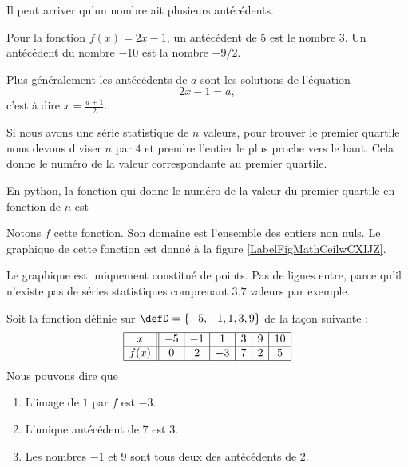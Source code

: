 Il peut arriver qu'un nombre ait plusieurs antécédents.

\begin{example}
    Pour la fonction \( f(x)=2x-1\), un antécédent de \( 5\) est le nombre \( 3\). Un antécédent du nombre \( -10\) est la nombre \( -9/2\).

    Plus généralement les antécédents de \( a\) sont les solutions de l'équation
    \begin{equation}
        2x-1=a,
    \end{equation}
    c'est à dire \( x=\frac{ a+1 }{2}\).
\end{example}

\begin{example} \label{EqlaIGDz}
    Si nous avons une série statistique de \( n\) valeurs, pour trouver le premier quartile nous devons diviser \( n\) par \( 4\) et prendre l'entier le plus proche vers le haut. Cela donne le numéro de la valeur correspondante au premier quartile.

    En python, la fonction qui donne le numéro de la valeur du premier quartile en fonction de \( n\) est
    \begin{quote}
    \end{quote}
    Notons \( f\) cette fonction. Son domaine est l'ensemble des entiers non nuls. Le graphique de cette fonction est donné à la figure \ref{LabelFigMathCeilwCXIJZ}.
\newcommand{\CaptionFigMathCeilwCXIJZ}{Le numéro de la valeur du premier quartile en fonction du nombre de valeurs.}


    Le graphique est uniquement constitué de points. Pas de lignes entre, parce qu'il n'existe pas de séries statistiques comprenant \( 3.7\) valeurs par exemple. 
\end{example}


\begin{example}
    Soit la fonction définie sur \( \defD=\{ -5,-1,1,3,9 \}\) de la façon suivante :
    \begin{equation}
        \begin{array}[h]{|c||c|c|c|c|c|c|}
            \hline
            x&-5&-1&1&3&9&10\\
            \hline
            f(x)&0&2&-3&7&2&5\\
            \hline
        \end{array}
    \end{equation}
    Nous pouvons dire que
    \begin{enumerate}
        \item
            L'image de \( 1\) par \( f\) est \( -3\).
        \item
            L'unique antécédent de \( 7\) est \( 3\).
        \item
            Les nombres \( -1\) et \( 9\) sont tous deux des antécédents de \( 2\).
    \end{enumerate}
\end{example}

